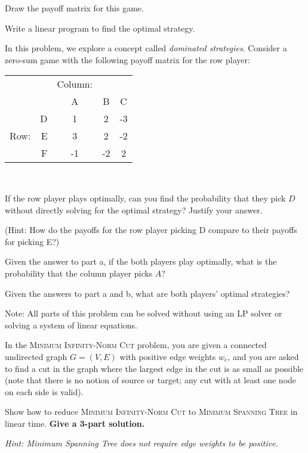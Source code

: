 \documentclass{article}
\begin{document}
\begin{subparts}

\subpart Draw the payoff matrix for this game.


\subpart Write a linear program to find the optimal strategy.

\end{subparts}



In this problem, we explore a concept called \textit{dominated strategies}. Consider a zero-sum game with the following payoff matrix for the row player:

\begin{tabular}{r r|c|c|c| }
		\multicolumn{1}{r}{}
		& \multicolumn{1}{r}{}
		&  \multicolumn{1}{r}{Column:}
		& \multicolumn{1}{r}{}
		& \multicolumn{1}{r}{}\\
		& & A & B & C \\
		\cline{2-5}
		& D & 1 & 2 & -3 \\
		\cline{2-5}
		Row: & E & 3 & 2 & -2 \\
		\cline{2-5}
		& F & -1 & -2 & 2 \\
		\cline{2-5}
\end{tabular} \\

\begin{subparts}

\subpart If the row player plays optimally, can you find the probability that they pick $D$ without directly solving for the optimal strategy? Justify your answer. 

(Hint: How do the payoffs for the row player picking D compare to their payoffs for picking E?) 

\subpart Given the answer to part a, if the both players play optimally, what is the probability that the column player picks $A$?

\subpart Given the answers to part a and b, what are both players' optimal strategies?

\end{subparts}

Note: All parts of this problem can be solved without using an LP solver or solving a system of linear equations.	

In the \textsc{Minimum Infinity-Norm Cut} problem, you are given a connected undirected graph $G=(V, E)$ with positive edge weights $w_e$, and you are asked to find a cut in the graph where the largest edge in the cut is as small as possible (note that there is no notion of source or target; any cut with at least one node on each side is valid). 

Show how to reduce \textsc{Minimum Infinity-Norm Cut} to \textsc{Minimum Spanning Tree} in linear time. \textbf{Give a 3-part solution.}

\textit{Hint: Minimum Spanning Tree does not require edge weights to be positive.}
\end{document}
